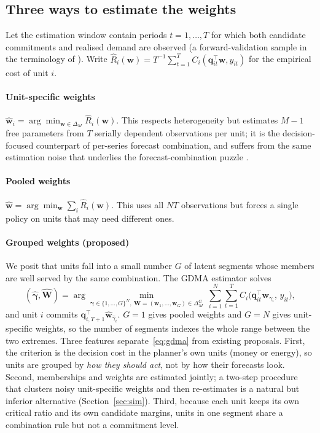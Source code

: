 \subsection{Three ways to estimate the weights}

Let the estimation window contain periods $t=1,\dots,T$ for which both candidate commitments and realised demand are observed (a forward-validation sample in the terminology of \citealp{ZhangZhang2023}).
Write $\widehat R_i(\bm w)=T^{-1}\sum_{t=1}^T C_i(\bm q_{it}^\top\bm w,y_{it})$ for the empirical cost of unit $i$.

\paragraph{Unit-specific weights} $\widehat{\bm w}_i=\arg\min_{\bm w\in\Delta_M}\widehat R_i(\bm w)$.
This respects heterogeneity but estimates $M-1$ free parameters from $T$ serially dependent observations per unit; it is the decision-focused counterpart of per-series forecast combination, and suffers from the same estimation noise that underlies the forecast-combination puzzle \citep{SmithWallis2009,Claeskens2016}.

\paragraph{Pooled weights} $\widehat{\bm w}=\arg\min_{\bm w}\sum_i\widehat R_i(\bm w)$.
This uses all $NT$ observations but forces a single policy on units that may need different ones.

\paragraph{Grouped weights (proposed)}
We posit that units fall into a small number $G$ of latent segments whose members are well served by the same combination.
The GDMA estimator solves
\begin{equation}\label{eq:gdma}
(\widehat{\bm\gamma},\widehat{\bm W})=\arg\min_{\bm\gamma\in\{1,\dots,G\}^N,\ \bm W=(\bm w_1,\dots,\bm w_G)\in\Delta_M^G}\ \sum_{i=1}^N\sum_{t=1}^T C_i\big(\bm q_{it}^\top\bm w_{\gamma_i},\,y_{it}\big),
\end{equation}
and unit $i$ commits $\bm q_{i,T+1}^\top\widehat{\bm w}_{\widehat\gamma_i}$.
$G=1$ gives pooled weights and $G=N$ gives unit-specific weights, so the number of segments indexes the whole range between the two extremes.
Three features separate~\eqref{eq:gdma} from existing proposals.
First, the criterion is the decision cost in the planner's own units (money or energy), so units are grouped by \emph{how they should act}, not by how their forecasts look.
Second, memberships and weights are estimated jointly; a two-step procedure that clusters noisy unit-specific weights and then re-estimates is a natural but inferior alternative (Section~\ref{sec:sim}).
Third, because each unit keeps its own critical ratio and its own candidate margins, units in one segment share a combination rule but not a commitment level.

